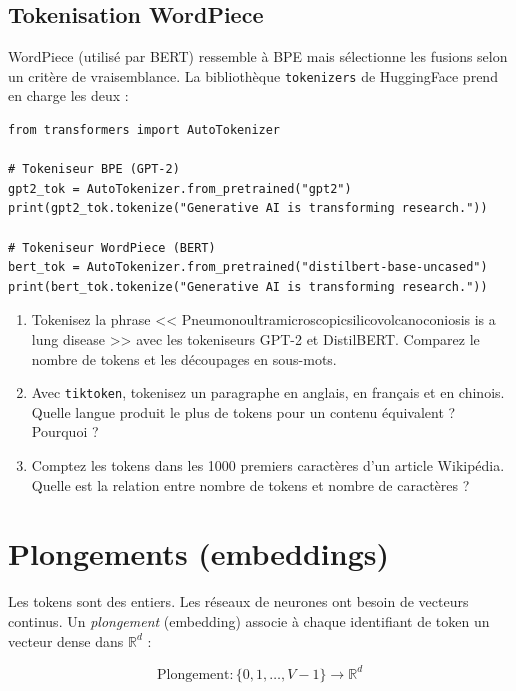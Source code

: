 \subsection{Tokenisation WordPiece}

WordPiece (utilis\'e par BERT) ressemble \`a BPE mais s\'electionne les fusions selon un crit\`ere de vraisemblance. La biblioth\`eque \texttt{tokenizers} de HuggingFace prend en charge les deux :

\begin{verbatim}
from transformers import AutoTokenizer

# Tokeniseur BPE (GPT-2)
gpt2_tok = AutoTokenizer.from_pretrained("gpt2")
print(gpt2_tok.tokenize("Generative AI is transforming research."))

# Tokeniseur WordPiece (BERT)
bert_tok = AutoTokenizer.from_pretrained("distilbert-base-uncased")
print(bert_tok.tokenize("Generative AI is transforming research."))
\end{verbatim}

\begin{exercise}
\begin{enumerate}
  \item Tokenisez la phrase << Pneumonoultramicroscopicsilicovolcanoconiosis is a lung disease >> avec les tokeniseurs GPT-2 et DistilBERT. Comparez le nombre de tokens et les d\'ecoupages en sous-mots.
  \item Avec \texttt{tiktoken}, tokenisez un paragraphe en anglais, en fran\c{c}ais et en chinois. Quelle langue produit le plus de tokens pour un contenu \'equivalent ? Pourquoi ?
  \item Comptez les tokens dans les 1000 premiers caract\`eres d'un article Wikip\'edia. Quelle est la relation entre nombre de tokens et nombre de caract\`eres ?
\end{enumerate}
\end{exercise}

\section{Plongements (embeddings)}

Les tokens sont des entiers. Les r\'eseaux de neurones ont besoin de vecteurs continus. Un \emph{plongement} (embedding) associe \`a chaque identifiant de token un vecteur dense dans $\mathbb{R}^d$ :

\[
\text{Plongement} : \{0, 1, \ldots, V-1\} \rightarrow \mathbb{R}^d
\]

